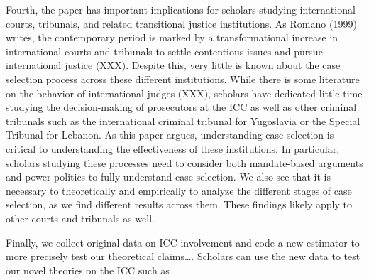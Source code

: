 Fourth, the paper has important implications for scholars studying international courts, tribunals, and related transitional justice institutions. As Romano (1999) writes, the contemporary period is marked by a transformational increase in international courts and tribunals to settle contentious issues and pursue international justice (XXX). Despite this, very little is known about the case selection process across these different institutions. While there is some literature on the behavior of international judges (XXX), scholars have dedicated little time studying the decision-making of prosecutors at the ICC as well as other criminal tribunals such as the international criminal tribunal for Yugoslavia or the Special Tribunal for Lebanon. As this paper argues, understanding case selection is critical to understanding the effectiveness of these institutions. In particular, scholars studying these processes need to consider both mandate-based arguments and power politics to fully understand case selection. We also see that it is necessary to theoretically and empirically to analyze the different stages of case selection, as we find different results across them. These findings likely apply to other courts and tribunals as well.

Finally, we collect original data on ICC involvement and code a new estimator to more precisely test our theoretical claims\ldots{}. Scholars can use the new data to test our novel theories on the ICC such as